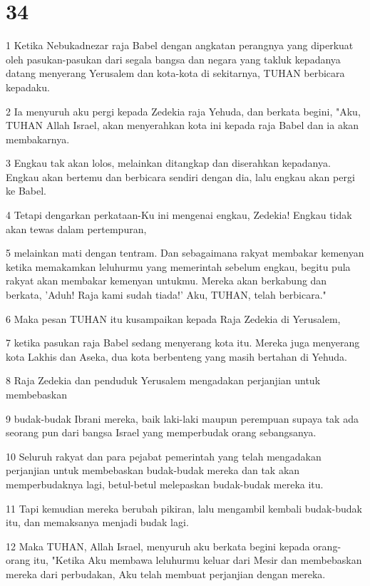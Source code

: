 \chapter{34}

\par 1 Ketika Nebukadnezar raja Babel dengan angkatan perangnya yang diperkuat oleh pasukan-pasukan dari segala bangsa dan negara yang takluk kepadanya datang menyerang Yerusalem dan kota-kota di sekitarnya, TUHAN berbicara kepadaku.
\par 2 Ia menyuruh aku pergi kepada Zedekia raja Yehuda, dan berkata begini, "Aku, TUHAN Allah Israel, akan menyerahkan kota ini kepada raja Babel dan ia akan membakarnya.
\par 3 Engkau tak akan lolos, melainkan ditangkap dan diserahkan kepadanya. Engkau akan bertemu dan berbicara sendiri dengan dia, lalu engkau akan pergi ke Babel.
\par 4 Tetapi dengarkan perkataan-Ku ini mengenai engkau, Zedekia! Engkau tidak akan tewas dalam pertempuran,
\par 5 melainkan mati dengan tentram. Dan sebagaimana rakyat membakar kemenyan ketika memakamkan leluhurmu yang memerintah sebelum engkau, begitu pula rakyat akan membakar kemenyan untukmu. Mereka akan berkabung dan berkata, 'Aduh! Raja kami sudah tiada!' Aku, TUHAN, telah berbicara."
\par 6 Maka pesan TUHAN itu kusampaikan kepada Raja Zedekia di Yerusalem,
\par 7 ketika pasukan raja Babel sedang menyerang kota itu. Mereka juga menyerang kota Lakhis dan Aseka, dua kota berbenteng yang masih bertahan di Yehuda.
\par 8 Raja Zedekia dan penduduk Yerusalem mengadakan perjanjian untuk membebaskan
\par 9 budak-budak Ibrani mereka, baik laki-laki maupun perempuan supaya tak ada seorang pun dari bangsa Israel yang memperbudak orang sebangsanya.
\par 10 Seluruh rakyat dan para pejabat pemerintah yang telah mengadakan perjanjian untuk membebaskan budak-budak mereka dan tak akan memperbudaknya lagi, betul-betul melepaskan budak-budak mereka itu.
\par 11 Tapi kemudian mereka berubah pikiran, lalu mengambil kembali budak-budak itu, dan memaksanya menjadi budak lagi.
\par 12 Maka TUHAN, Allah Israel, menyuruh aku berkata begini kepada orang-orang itu, "Ketika Aku membawa leluhurmu keluar dari Mesir dan membebaskan mereka dari perbudakan, Aku telah membuat perjanjian dengan mereka.
